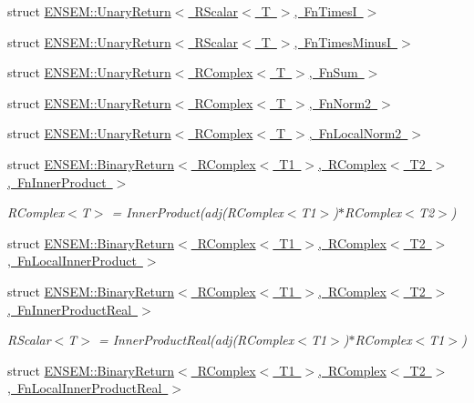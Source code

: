\begin{DoxyCompactItemize}
struct \mbox{\hyperlink{structENSEM_1_1UnaryReturn_3_01RScalar_3_01T_01_4_00_01FnTimesI_01_4}{E\+N\+S\+E\+M\+::\+Unary\+Return$<$ R\+Scalar$<$ T $>$, Fn\+Times\+I $>$}}
\item 
struct \mbox{\hyperlink{structENSEM_1_1UnaryReturn_3_01RScalar_3_01T_01_4_00_01FnTimesMinusI_01_4}{E\+N\+S\+E\+M\+::\+Unary\+Return$<$ R\+Scalar$<$ T $>$, Fn\+Times\+Minus\+I $>$}}
\item 
struct \mbox{\hyperlink{structENSEM_1_1UnaryReturn_3_01RComplex_3_01T_01_4_00_01FnSum_01_4}{E\+N\+S\+E\+M\+::\+Unary\+Return$<$ R\+Complex$<$ T $>$, Fn\+Sum $>$}}
\item 
struct \mbox{\hyperlink{structENSEM_1_1UnaryReturn_3_01RComplex_3_01T_01_4_00_01FnNorm2_01_4}{E\+N\+S\+E\+M\+::\+Unary\+Return$<$ R\+Complex$<$ T $>$, Fn\+Norm2 $>$}}
\item 
struct \mbox{\hyperlink{structENSEM_1_1UnaryReturn_3_01RComplex_3_01T_01_4_00_01FnLocalNorm2_01_4}{E\+N\+S\+E\+M\+::\+Unary\+Return$<$ R\+Complex$<$ T $>$, Fn\+Local\+Norm2 $>$}}
\item 
struct \mbox{\hyperlink{structENSEM_1_1BinaryReturn_3_01RComplex_3_01T1_01_4_00_01RComplex_3_01T2_01_4_00_01FnInnerProduct_01_4}{E\+N\+S\+E\+M\+::\+Binary\+Return$<$ R\+Complex$<$ T1 $>$, R\+Complex$<$ T2 $>$, Fn\+Inner\+Product $>$}}
\begin{DoxyCompactList}\small\item\em R\+Complex$<$\+T$>$ = Inner\+Product(adj(\+R\+Complex$<$\+T1$>$)$\ast$\+R\+Complex$<$\+T2$>$) \end{DoxyCompactList}\item 
struct \mbox{\hyperlink{structENSEM_1_1BinaryReturn_3_01RComplex_3_01T1_01_4_00_01RComplex_3_01T2_01_4_00_01FnLocalInnerProduct_01_4}{E\+N\+S\+E\+M\+::\+Binary\+Return$<$ R\+Complex$<$ T1 $>$, R\+Complex$<$ T2 $>$, Fn\+Local\+Inner\+Product $>$}}
\item 
struct \mbox{\hyperlink{structENSEM_1_1BinaryReturn_3_01RComplex_3_01T1_01_4_00_01RComplex_3_01T2_01_4_00_01FnInnerProductReal_01_4}{E\+N\+S\+E\+M\+::\+Binary\+Return$<$ R\+Complex$<$ T1 $>$, R\+Complex$<$ T2 $>$, Fn\+Inner\+Product\+Real $>$}}
\begin{DoxyCompactList}\small\item\em R\+Scalar$<$\+T$>$ = Inner\+Product\+Real(adj(\+R\+Complex$<$\+T1$>$)$\ast$\+R\+Complex$<$\+T1$>$) \end{DoxyCompactList}\item 
struct \mbox{\hyperlink{structENSEM_1_1BinaryReturn_3_01RComplex_3_01T1_01_4_00_01RComplex_3_01T2_01_4_00_01FnLocalInnerProductReal_01_4}{E\+N\+S\+E\+M\+::\+Binary\+Return$<$ R\+Complex$<$ T1 $>$, R\+Complex$<$ T2 $>$, Fn\+Local\+Inner\+Product\+Real $>$}}

\end{DoxyCompactItemize}
